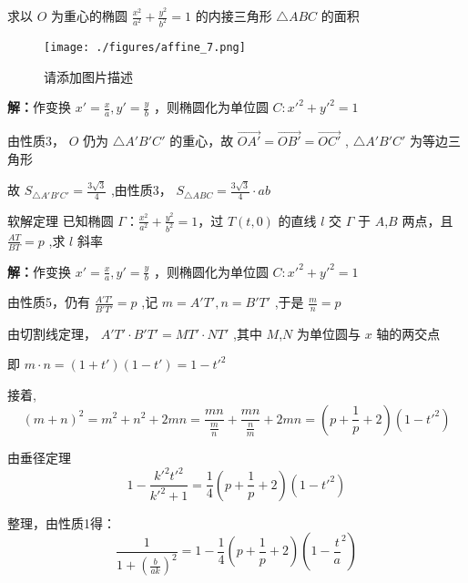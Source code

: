 \begin{corollary}{}
求以 $\displaystyle{O}$ 为重心的椭圆 $\displaystyle{\frac{x^2}{a^2}+\frac{y^2}{b^2}=1}$ 的内接三角形 $\displaystyle{\triangle ABC}$ 的面积
\begin{figure}[ht]
\centering
\texttt{[image: ./figures/affine\_7.png]}
\caption{请添加图片描述} \label{affine_fig7}
\end{figure}
\textbf{解：}作变换 $\displaystyle{x'=\frac{x}{a},y'=\frac{y}{b}}$ ，则椭圆化为单位圆 $\displaystyle{C:x'^2+y'^2=1}$

由性质3， $\displaystyle{O}$ 仍为 $\displaystyle{\triangle A'B'C'}$ 的重心，故 $\displaystyle{\vec{OA'}=\vec{OB'}=\vec{OC'}}$  , $\displaystyle{\triangle A'B'C'}$ 为等边三角形

故 $\displaystyle{S_{\triangle A'B'C'}=\frac{3\sqrt{3}}{4}}$ ,由性质3， $\displaystyle{S_{\triangle ABC}=\frac{3\sqrt{3}}{4}\cdot ab}$ 
\end{corollary}
\begin{corollary}{软解定理}
已知椭圆 $\displaystyle{\Gamma：\frac{x^2}{a^2}+\frac{y^2}{b^2}=1}$，过 $\displaystyle{T(t,0)}$ 的直线 $\displaystyle{l}$ 交 $\displaystyle{\Gamma}$ 于 $\displaystyle{A}$,$\displaystyle{B}$ 两点，且 $\displaystyle{\frac{AT}{BT}=p}$ ,求 $\displaystyle{l}$ 斜率

\textbf{解：}作变换 $\displaystyle{x'=\frac{x}{a},y'=\frac{y}{b}}$ ，则椭圆化为单位圆 $\displaystyle{C:x'^2+y'^2=1}$

由性质5，仍有 $\displaystyle{\frac{A'T'}{B'T'}=p}$ ,记 $\displaystyle{m=A'T',n=B'T'}$ ,于是 $\displaystyle{\frac{m}{n}=p}$ 

由切割线定理， $\displaystyle{A'T'\cdot B'T'=MT'\cdot NT'}$ ,其中 $\displaystyle{M}$,$\displaystyle{N}$ 为单位圆与 $\displaystyle{x}$ 轴的两交点

即 $\displaystyle{m\cdot n=(1+t')(1-t')=1-t'^2}$ 

接着,
$$(m+n)^2=m^2+n^2+2mn=\frac{mn}{\frac{m}{n}}+\frac{mn}{\frac{n}{m}}+2mn=\left(p+\frac{1}{p}+2\right)(1-t'^2)$$

由垂径定理
$$1-\frac{k'^2t'^2}{k'^2+1}=\frac{1}{4}\left(p+\frac{1}{p}+2\right)(1-t'^2)$$ 

整理，由性质1得：
$$\frac{1}{1+(\frac{b}{ak})^2}=1-\frac{1}{4}\left(p+\frac{1}{p}+2\right)\left(1-\frac{t}{a}^2\right)$$ 

\end{corollary}

